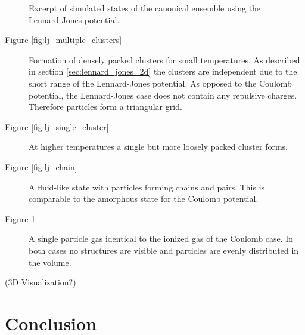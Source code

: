 \documentclass[11pt, a4paper]{article}
\numberwithin{equation}{section}
\newcommand{\remark}[1]{{\color{red}(#1)}}
\begin{document}
\begin{figure}[h]
\begin{subfigure}[t]{0.48\textwidth}
		\label{fig:lj_gas}
		\vspace*{0.3cm}
	\end{subfigure}
	\caption{Excerpt of simulated states of the canonical ensemble using the Lennard-Jones potential.}
	\label{fig:lj_vis}
\end{figure}
\begin{description}
	\item[Figure \ref{fig:lj_multiple_clusters}] 
		Formation of densely packed clusters for small temperatures.
		As described in section \ref{sec:lennard_jones_2d} the clusters are independent due to the short range of the Lennard-Jones potential.
		As opposed to the Coulomb potential, the Lennard-Jones case does not contain any repulsive charges.
		Therefore particles form a triangular grid.
		
	\item[Figure \ref{fig:lj_single_cluster}]
		At higher temperatures a single but more loosely packed cluster forms.
	
	\item[Figure \ref{fig:lj_chain}]
		A fluid-like state with particles forming chains and pairs.
		This is comparable to the amorphous state for the Coulomb potential.
	
	\item[Figure \ref{fig:lj_gas}] 
		A single particle gas identical to the ionized gas of the Coulomb case.
		In both cases no structures are visible and particles are evenly distributed in the volume.
\end{description}



\remark{3D Visualization?}

\clearpage
\section{Conclusion}
\end{document}
